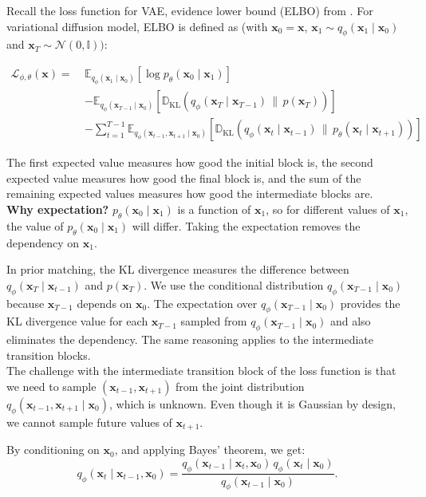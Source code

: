 \documentclass{article}
\newcommand{\x}{\mathbf{x}}
\newcommand{\N}{\mathcal{N}}
\newcommand{\E}{\mathbb{E}}
\newcommand{\D}{\mathbb{D}}
\newcommand{\dklbar}{\,\|\,}
\begin{document}
	Recall the loss function for VAE, evidence lower bound (ELBO) from \cite{kingma2014}. For variational diffusion model, ELBO is defined as (with $\x_0 = \x$, $\x_1 \sim q_\phi(\x_1 \mid \x_0)
	$ and $\x_T \sim \N(0, \mathbb{I}))$:
	
	$$\begin{aligned}
		\mathcal{L}_{\phi, \theta} (\x) =\ & 
		\E_{q_\phi(\x_1 \mid \x_0)} 
		\left[ \log p_\theta(\x_0 \mid \x_1) \right] \\
		& - \mathbb{E}_{q_\phi(\x_{T-1} \mid \x_0)} 
		\left[ \D_{\mathrm{KL}} \left( q_\phi(\x_T \mid \x_{T-1}) \dklbar p(\x_T) \right) \right] \\
		& - \sum_{t=1}^{T-1} \E_{q_\phi(\x_{t-1}, \x_{t+1} \mid \x_0)} 
		\left[ \D_{\mathrm{KL}} \left( q_\phi(\x_t \mid \x_{t-1}) \dklbar p_\theta(\x_t \mid \x_{t+1}) \right) \right]
	\end{aligned}$$
	
	The first expected value measures how good the initial block is, the second expected value measures how good the final block is, and the sum of the remaining expected values measures how good the intermediate blocks are. \\
	
	\textbf{Why expectation?} $p_\theta(\x_0 \mid \x_1)$ is a function of $\x_1$, so for different values of $\x_1$, the value of $p_\theta(\x_0 \mid \x_1)$ will differ. Taking the expectation removes the dependency on $\x_1$.
	
	In prior matching, the KL divergence measures the difference between $q_\phi(\x_T \mid \x_{t-1})$ and $p(\x_T)$. We use the conditional distribution $q_\phi(\x_{T-1} \mid \x_0)$ because $\x_{T-1}$ depends on $\x_0$. The expectation over $q_\phi(\x_{T-1} \mid \x_0)$ provides the KL divergence value for each $\x_{T-1}$ sampled from $q_\phi(\x_{T-1} \mid \x_0)$ and also eliminates the dependency. The same reasoning applies to the intermediate transition blocks.\\
	
	The challenge with the intermediate transition block of the loss function is that we need to sample $(\x_{t-1}, \x_{t+1})$ from the joint distribution $q_\phi(\x_{t-1}, \x_{t+1} \mid \x_0)$, which is unknown. Even though it is Gaussian by design, we cannot sample future values of $\x_{t+1}$. 
	
	By conditioning on $\x_0$, and applying Bayes' theorem, we get:
	$$
	q_\phi(\x_t \mid \x_{t-1}, \x_0) = \frac{q_\phi(\x_{t-1} \mid \x_t, \x_0)\, q_\phi(\x_t \mid \x_0)}{q_\phi(\x_{t-1} \mid \x_0)}.
	$$
	
\end{document}
